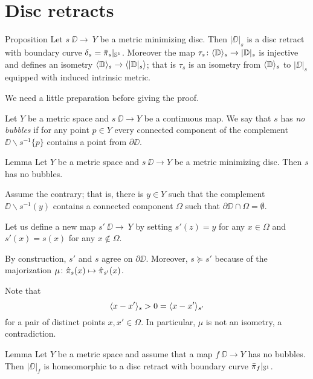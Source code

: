 \section{Disc retracts}\label{Metric minimizing discs}

\begin{thm}{Proposition}\label{prop:|D|}
Let $s\:\DD\to\ Y$ be a metric minimizing disc.
Then $|\DD|_s$ is a disc retract with boundary curve $\delta_s=\bar\pi_s|_{\mathbb{S}^1}$.
Moreover the map $\tau_s\colon\langle\mathbb{D}\rangle_s\to |\mathbb{D}|_s$ is injective and defines an isometry
$\langle\mathbb{D}\rangle_s\to \langle|\mathbb{D}|_s\rangle$;
that is $\tau_s$ is an isometry from $\langle\mathbb{D}\rangle_s$ to $|\DD|_s$ equipped with induced intrinsic metric.
\end{thm}

We need a little preparation before giving the proof.

Let $Y$ be a metric space and
$s\:\DD\to Y$ be a continuous map.
We say that $s$ has \label{page:no-bubble}\emph{no bubbles}
if for any point $p\in Y$ every connected component of the complement $\DD\backslash s^{-1}\{p\}$ contains a point from $\partial \DD$.

\begin{thm}{Lemma}\label{prop:point-complement}
Let $Y$ be a metric space and $s\:\DD\to Y$ be a metric minimizing disc.
Then $s$ has no bubbles.
\end{thm}

Assume the contrary;
that is, there is $y\in Y$ such that the complement $\DD\backslash s^{-1}(y)$ contains a connected component $\Omega$ 
such that $\partial \DD\cap \Omega=\emptyset$.

Let us define a new map $s'\:\DD\to\ Y$ by setting $s'(z)=y$ for any $x\in \Omega$ and $s'(x)=s(x)$ for any $x\notin \Omega$.

By construction, $s'$ and $s$ agree on $\partial\DD$. Moreover, $s\succcurlyeq s'$
because of the majorization $\mu\:\hat\pi_s(x)\zz\mapsto \hat\pi_{s'}(x)$.

Note that
\[\langle x-x'\rangle_{s}>0=\langle x-x'\rangle_{s'}\]
for a pair of distinct points $x,x'\in \Omega$.
In particular, $\mu$ is not an isometry, a contradiction.
\qeds



\begin{thm}{Lemma}\label{prop:disc-moore}
Let $Y$ be a metric space and assume that a map $f\:\DD\to Y$ has no bubbles.
Then $|\DD|_f$ is homeomorphic to a disc retract with boundary curve $\bar\pi_f|_{\mathbb{S}^1}$.
\end{thm}

